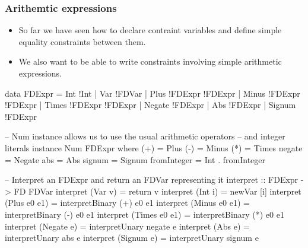 \documentclass[aspectratio=169,hyphens]{beamer} %
\begin{document}
\begin{frame}[fragile]
    \frametitle{Arithemtic expressions}
    \begin{itemize}
        \item So far we have seen how to declare contraint variables and define simple equality constraints
            between them.
            \pause
        \item We also want to be able to write constraints involving simple arithmetic expressions.
    \end{itemize}
\end{frame}
\begin{frame}[fragile]
    \begin{code}
data FDExpr
    = Int !Int
    | Var !FDVar
    | Plus !FDExpr !FDExpr
    | Minus !FDExpr !FDExpr
    | Times !FDExpr !FDExpr
    | Negate !FDExpr
    | Abs !FDExpr
    | Signum !FDExpr
    \end{code}
\pause
    \begin{code}

-- Num instance allows us to use the usual arithmetic operators
-- and integer literals
instance Num FDExpr where
    (+) = Plus
    (-) = Minus
    (*) = Times
    negate = Negate
    abs = Abs
    signum = Signum
    fromInteger = Int . fromInteger
    \end{code}
\end{frame}

\begin{frame}[fragile]
    \pause
    \begin{code}

-- Interpret an FDExpr and return an FDVar representing it
interpret :: FDExpr -> FD FDVar
interpret (Var v) = return v
interpret (Int i) = newVar [i]
interpret (Plus e0 e1) = interpretBinary (+) e0 e1
interpret (Minus e0 e1) = interpretBinary (-) e0 e1
interpret (Times e0 e1) = interpretBinary (*) e0 e1
interpret (Negate e) = interpretUnary negate e
interpret (Abs e) = interpretUnary abs e
interpret (Signum e) = interpretUnary signum e
    \end{code}
\end{frame}
\end{document}
